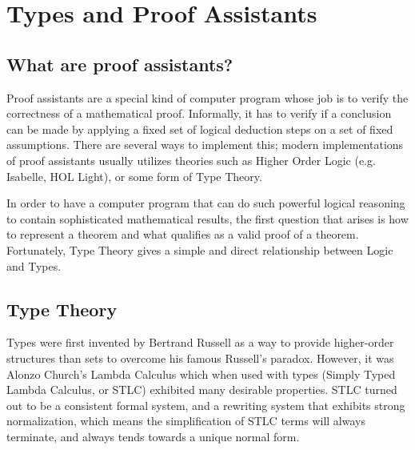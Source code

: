 \chapter{Types and Proof Assistants}

\section{What are proof assistants?}
Proof assistants are a special kind of computer program whose job is to verify
the correctness of a mathematical proof. Informally, it has to verify if a
conclusion can be made by applying a fixed set of logical deduction steps on a
set of fixed assumptions. There are several ways to implement this; modern
implementations of proof assistants usually utilizes theories such as Higher
Order Logic (e.g. Isabelle, HOL Light), or some form of Type Theory.

In order to have a computer program that can do such powerful logical
reasoning to contain sophisticated mathematical results, the first 
question that arises is how to represent a theorem and what qualifies
as a valid proof of a theorem. Fortunately, Type Theory gives a simple
and direct relationship between Logic and Types.

\section{Type Theory}

Types were first invented by Bertrand Russell as a way to provide higher-order
structures than sets to overcome his famous Russell's paradox. However, it was
Alonzo Church's Lambda Calculus which when used with types (Simply Typed Lambda
Calculus, or STLC) exhibited many desirable properties. STLC turned out to be a
consistent formal system, and a rewriting system that exhibits strong
normalization, which means the simplification of STLC terms will always
terminate, and always tends towards a unique normal form.


